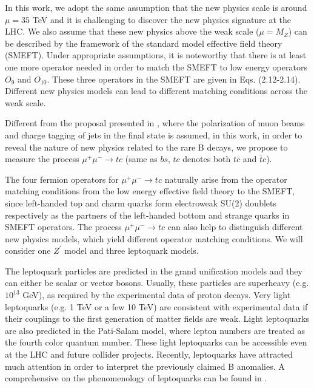 \documentclass[a4paper,11pt]{article}
\begin{document}
In this work, we adopt the same assumption that the new physics scale is around $\mu=35$ TeV and it is challenging to discover the new physics signature at the LHC. 
We also assume that these new physics above the weak scale ($\mu=M_Z$) can be described by the framework of the standard model effective field theory (SMEFT). 
Under appropriate assumptions, it is noteworthy that there is at least one more operator needed in order to match the SMEFT to low energy operators $O_9$ and $O_{10}$. 
These three operators in the SMEFT are given in Eqs. (2.12-2.14). 
Different new physics models can lead to different matching conditions across the weak scale.

Different from the proposal presented in \cite{Altmannshofer:2022xri}, 
where the polarization of muon beams and charge tagging of jets in the final state is assumed, 
in this work, in order to reveal the nature of new physics related to the rare B decays, 
we propose to measure the process $\mu^+\mu^-\to tc$ (same as $bs$,  $tc$ denotes both $t \bar{c}$ and $\bar{t} c$). 
{}

{\color{red}{This study shows that the measurement of $tc$ final state can provide complementary information to the process $\mu^+\mu^-\to b s$.}}
The four fermion operators for $\mu^+\mu^-\to tc$ naturally arise from the operator matching conditions from the low energy effective field theory to the SMEFT, 
since left-handed top and charm quarks form electroweak SU(2) doublets respectively as the partners of the left-handed bottom and strange quarks in SMEFT operators. 
The process $\mu^+\mu^-\to tc$ can also help to distinguish different new physics models, which yield different operator matching conditions. 
We will consider one $Z^\prime$ model and three leptoquark models.
 
The leptoquark particles are predicted in the grand unification models and they can either be scalar or vector bosons. 
Usually, these particles are superheavy (e.g. $10^{13}$ GeV), as required by the experimental data of proton decays. 
Very light leptoquarks (e.g. 1 TeV or a few 10 TeV) are consistent with experimental data if their couplings to the first generation of matter fields are weak. 
Light leptoquarks are also predicted in the Pati-Salam model, where lepton numbers are treated as the fourth color quantum number. 
These light leptoquarks can be accessible even at the LHC and future collider projects. 
Recently, leptoquarks have attracted much attention in order to interpret the previously claimed B anomalies. 
A comprehensive on the phenomenology of leptoquarks can be found in \cite{Dorsner:2016wpm}.
\end{document}
